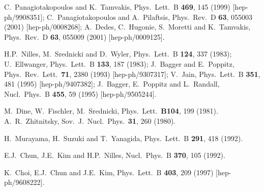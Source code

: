 \documentclass[11pt]{article}
\begin{document}
\begin{thebibliography}{999}
C.~Panagiotakopoulos and K.~Tamvakis,
  Phys.\ Lett.\ B {\bf 469}, 145 (1999)
  [hep-ph/9908351];
C.~Panagiotakopoulos and A.~Pilaftsis,
  Phys.\ Rev.\ D {\bf 63}, 055003 (2001)
  [hep-ph/0008268];
A.~Dedes, C.~Hugonie, S.~Moretti and K.~Tamvakis,
  Phys.\ Rev.\ D {\bf 63}, 055009 (2001)
  [hep-ph/0009125].

H.P.~Nilles, M.~Srednicki and D.~Wyler,
  Phys.\ Lett.\ B {\bf 124}, 337 (1983);
U.~Ellwanger,
  Phys.\ Lett.\ B {\bf 133}, 187 (1983);
J.~Bagger and E.~Poppitz,
  Phys.\ Rev.\ Lett.\  {\bf 71}, 2380 (1993)
  [hep-ph/9307317];
V.~Jain,
  Phys.\ Lett.\ B {\bf 351}, 481 (1995)
  [hep-ph/9407382];
J.~Bagger, E.~Poppitz and L.~Randall,
  Nucl.\ Phys.\ B {\bf 455}, 59 (1995)
  [hep-ph/9505244].

  M.~Dine, W.~Fischler, M.~Srednicki,
  Phys.\ Lett.\  {\bf B104}, 199 (1981).
  A.~R.~Zhitnitsky,
  Sov.\ J.\ Nucl.\ Phys.\  {\bf 31}, 260 (1980).

  H.~Murayama, H.~Suzuki and T.~Yanagida,
  Phys.\ Lett.\  B {\bf 291}, 418 (1992).

E.J.~Chun, J.E.~Kim and H.P.~Nilles, 
  Nucl.\ Phys.\ B {\bf 370}, 105 (1992).

  K.~Choi, E.J.~Chun and J.E.~Kim,
  Phys.\ Lett.\  B {\bf 403}, 209 (1997)
  [hep-ph/9608222].


\end{thebibliography}
\end{document}
